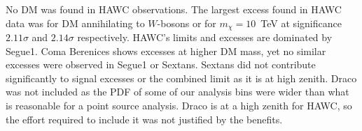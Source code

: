 No DM was found in HAWC observations.
The largest excess found in HAWC data was for DM annihilating to $W$-bosons or  for $m_\chi = 10$~TeV at significance $2.11\sigma$ and $2.14\sigma$ respectively.
HAWC's limits and excesses are dominated by Segue1.
Coma Berenices shows excesses at higher DM mass, yet no similar excesses were observed in Segue1 or Sextans.
Sextans did not contribute significantly to signal excesses or the combined limit as it is at high zenith.
Draco was not included as the PDF of some of our analysis bins were wider than what is reasonable for a point source analysis.
Draco is at a high zenith for HAWC, so the effort required to include it was not justified by the benefits.

\begin{figure}[h]
\end{figure}
